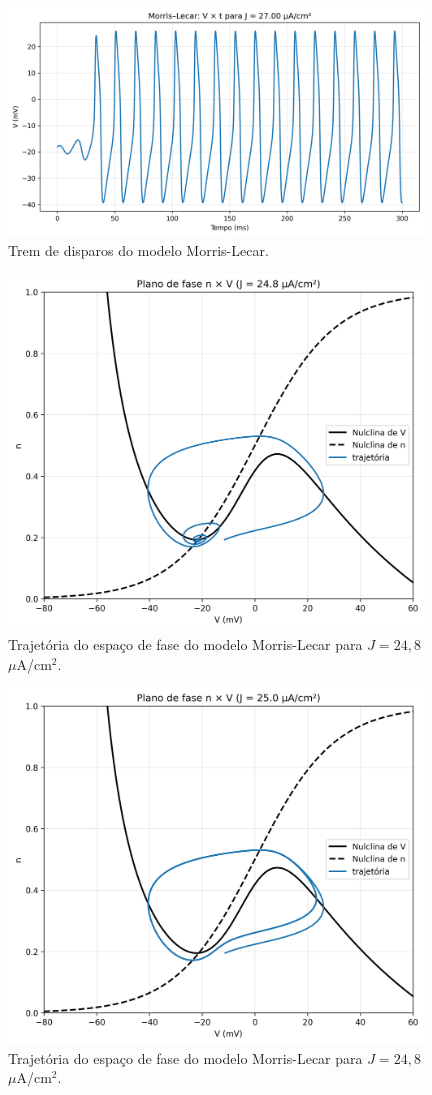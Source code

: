 \documentclass[english,11pt,a4paper]{article}
\begin{document}
	\begin{figure}[H]
		\centering
		\includegraphics[width=11cm]{../figures/ex_2c_Vt.png}
		\caption{Trem de disparos do modelo Morris-Lecar.}
	\end{figure}
	
	\begin{figure}[H]
		\centering
		\includegraphics[width=11cm]{../figures/ex_2c_phase_J24p8.png}
		\caption{Trajetória do espaço de fase do modelo Morris-Lecar para $J = 24,8$ $\mu$A/cm$^2$.}
	\end{figure}
	
	\begin{figure}[H]
		\centering
		\includegraphics[width=11cm]{../figures/ex_2c_phase_J25p0.png}
		\caption{Trajetória do espaço de fase do modelo Morris-Lecar para $J = 24,8$ $\mu$A/cm$^2$.}
	\end{figure}
	
\end{document}
